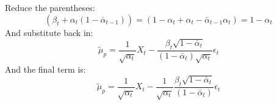 \documentclass[a4paper, 12pt]{olplainarticle}
\begin{document}
Reduce the parentheses:
\begin{equation}
    \left( \beta_t + \alpha_t (1-\bar{\alpha}_{t-1}) \right) = \left( 1 - \alpha_t + \alpha_t - \bar{\alpha}_{t-1} \alpha_t \right) = 1 - \alpha_t
\end{equation}
And substitute back in:
\begin{equation}
    \tilde{\mu}_p = \frac{1}{\sqrt{\alpha_t}} X_t - \frac{\beta_t \sqrt{1-\bar{\alpha}_t} }{(1-\bar{\alpha}_t) \sqrt{\alpha_t}} \epsilon_t
\end{equation}
And the final term is:
\begin{equation}
    \tilde{\mu}_p = \frac{1}{\sqrt{\alpha_t}} X_t - \frac{1}{\sqrt{\alpha_t}} \frac{\beta_t \sqrt{1-\bar{\alpha}_t} }{(1-\bar{\alpha}_t)} \epsilon_t
\end{equation}
\end{document}
